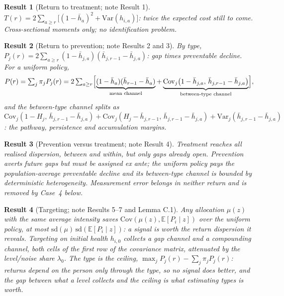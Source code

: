 \documentclass[11pt]{article}
\newtheorem{result}{Result}
\newcommand{\E}{\mathbb{E}}
\newcommand{\Var}{\mathrm{Var}}
\newcommand{\Cov}{\mathrm{Cov}}
\begin{document}
\begin{result}[Return to treatment; note Result 1]\label{res:treat}
$T(r)=2\sum_{a\ge r}\bigl[(1-\bar h_a)^2+\Var(h_{i,a})\bigr]$: twice the expected cost still to come. Cross-sectional moments only; no identification problem.
\end{result}

\begin{result}[Return to prevention; note Results 2 and 3]\label{res:prev}
By type, $P_j(r)=2\sum_{a\ge r}(1-\bar h_{j,a})(\bar h_{j,r-1}-\bar h_{j,a})$: gap times preventable decline. For a uniform policy,
\begin{equation}
P(r)=\textstyle\sum_j\pi_jP_j(r)
=2\sum_{a\ge r}\Bigl[\underbrace{(1-\bar h_a)(\bar h_{r-1}-\bar h_a)}_{\text{mean channel}}
+\underbrace{\Cov_j\bigl(1-\bar h_{j,a},\,\bar h_{j,r-1}-\bar h_{j,a}\bigr)}_{\text{between-type channel}}\Bigr],
\label{eq:P}
\end{equation}
and the between-type channel splits as $\Cov_j(1-H_j,\,\bar h_{j,r-1}-\bar h_{j,a})+\Cov_j(H_j-\bar h_{j,r-1},\,\bar h_{j,r-1}-\bar h_{j,a}) +\Var_j(\bar h_{j,r-1}-\bar h_{j,a})$: the pathway, persistence and accumulation margins.
\end{result}

\begin{result}[Prevention versus treatment; note Result 4]\label{res:pvt}
Treatment reaches all realised dispersion, between and within, but only gaps already open. Prevention averts future gaps but must be assigned ex ante; the uniform policy pays the population-average preventable decline and its between-type channel is bounded by deterministic heterogeneity. Measurement error belongs in neither return and is removed by Case~4 below.
\end{result}

\begin{result}[Targeting; note Results 5--7 and Lemma C.1]\label{res:target}
Any allocation $\mu(z)$ with the same average intensity saves $\Cov(\mu(z),\E[P_i\mid z])$ over the uniform policy, at most $\mathrm{sd}(\mu)\,\mathrm{sd}(\E[P_i\mid z])$: a signal is worth the return dispersion it reveals. Targeting on initial health $h_{i,0}$ collects a gap channel and a compounding channel, both cells of the first row of the covariance matrix, attenuated by the level/noise share $\lambda_0$. The type is the ceiling, $\max_jP_j(r)-\sum_j\pi_jP_j(r)$: returns depend on the person only through the type, so no signal does better, and the gap between what a level collects and the ceiling is what estimating types is worth.
\end{result}
\end{document}
